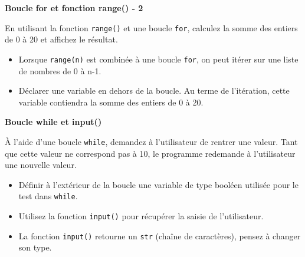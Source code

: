     \begin{Exercice}[5 minutes] \textbf{Boucle for et fonction range() - 2}
      	
      	En utilisant la fonction \lstinline{range()} et une boucle \lstinline{for}, calculez la somme des entiers de 0 à 20 et affichez le résultat.
    
        \begin{conseil}
           \begin{itemize}
           	\item Lorsque \lstinline{range(n)} est combinée à une boucle \lstinline{for}, on peut itérer sur une liste de nombres de 0 à n-1.
           	\item Déclarer une variable en dehors de la boucle. Au terme de l'itération, cette variable contiendra la somme des entiers de 0 à 20.
           \end{itemize}
		     
        \end{conseil}
        
        \begin{solution}
            
        \end{solution}
    \end{Exercice}

    
 \begin{Exercice}[10 minutes] \textbf{Boucle while et input()}
      	
      	À l'aide d'une boucle \lstinline{while}, demandez à l'utilisateur de rentrer une valeur. Tant que cette valeur ne correspond pas à 10, le programme redemande à l'utilisateur une nouvelle valeur.
    
        \begin{conseil}
           \begin{itemize}
           	\item Définir à l'extérieur de la boucle une variable de type booléen utilisée pour le test dans \lstinline{while}.
           	\item Utilisez la fonction \lstinline{input()} pour récupérer la saisie de l'utilisateur.
           	\item La fonction \lstinline{input()} retourne un \lstinline{str} (chaîne de caractères), pensez à changer son type.
           \end{itemize}
		     
        \end{conseil}
        
        \begin{solution}
            
        \end{solution}
    \end{Exercice}


